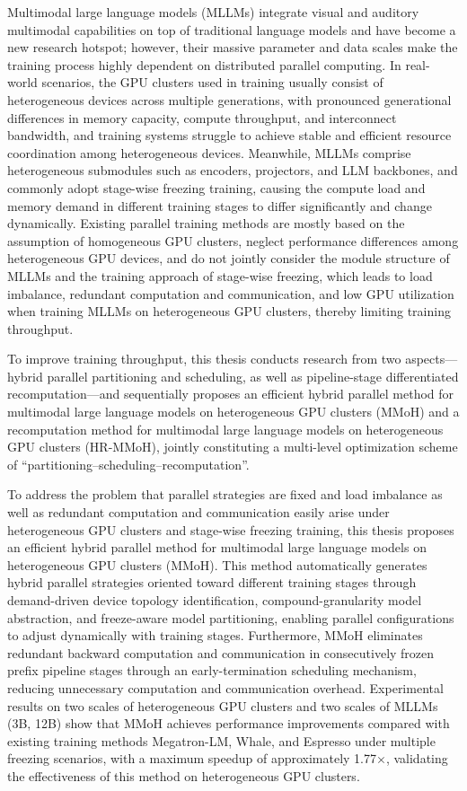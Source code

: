\begin{eabstract}
Multimodal large language models (MLLMs) integrate visual and auditory multimodal capabilities on top of traditional language models and have become a new research hotspot; however, their massive parameter and data scales make the training process highly dependent on distributed parallel computing.
In real-world scenarios, the GPU clusters used in training usually consist of heterogeneous devices across multiple generations, with pronounced generational differences in memory capacity, compute throughput, and interconnect bandwidth, and training systems struggle to achieve stable and efficient resource coordination among heterogeneous devices.
Meanwhile, MLLMs comprise heterogeneous submodules such as encoders, projectors, and LLM backbones, and commonly adopt stage-wise freezing training, causing the compute load and memory demand in different training stages to differ significantly and change dynamically.
Existing parallel training methods are mostly based on the assumption of homogeneous GPU clusters, neglect performance differences among heterogeneous GPU devices, and do not jointly consider the module structure of MLLMs and the training approach of stage-wise freezing, which leads to load imbalance, redundant computation and communication, and low GPU utilization when training MLLMs on heterogeneous GPU clusters, thereby limiting training throughput.

To improve training throughput, this thesis conducts research from two aspects---hybrid parallel partitioning and scheduling, as well as pipeline-stage differentiated recomputation---and sequentially proposes an efficient hybrid parallel method for multimodal large language models on heterogeneous GPU clusters (MMoH) and a recomputation method for multimodal large language models on heterogeneous GPU clusters (HR-MMoH), jointly constituting a multi-level optimization scheme of ``partitioning--scheduling--recomputation''.

To address the problem that parallel strategies are fixed and load imbalance as well as redundant computation and communication easily arise under heterogeneous GPU clusters and stage-wise freezing training, this thesis proposes an efficient hybrid parallel method for multimodal large language models on heterogeneous GPU clusters (MMoH).
This method automatically generates hybrid parallel strategies oriented toward different training stages through demand-driven device topology identification, compound-granularity model abstraction, and freeze-aware model partitioning, enabling parallel configurations to adjust dynamically with training stages.
Furthermore, MMoH eliminates redundant backward computation and communication in consecutively frozen prefix pipeline stages through an early-termination scheduling mechanism, reducing unnecessary computation and communication overhead.
Experimental results on two scales of heterogeneous GPU clusters and two scales of MLLMs (3B, 12B) show that MMoH achieves performance improvements compared with existing training methods Megatron-LM, Whale, and Espresso under multiple freezing scenarios, with a maximum speedup of approximately 1.77$\times$, validating the effectiveness of this method on heterogeneous GPU clusters.


\end{eabstract}
